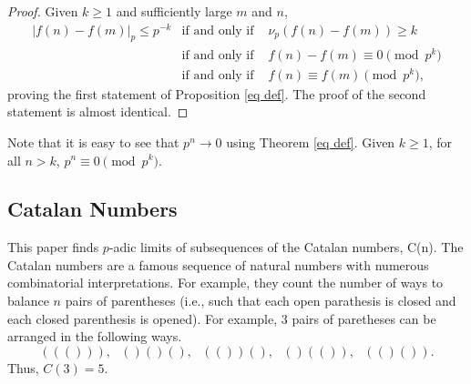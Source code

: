 \documentclass[12pt, letter]{article}    %
\theoremstyle{plain}
\newtheorem{theorem}{Theorem}[section]
\theoremstyle{definition}
\numberwithin{equation}{section}
\newcommand{\Lim}[1]{\raisebox{0.5ex}{\scalebox{0.8}{$\displaystyle \lim_{#1}\;$}}}
\newcommand{\thref}[1]{Theorem \ref{#1}}
\newcommand{\propref}[1]{Proposition \ref{#1}}
\newcommand{\fcite}[1]{[#1]}
\newcommand{\thlabel}[1]{\label{#1}}
\begin{document}
\begin{proof}
Given $k\geq1$ and sufficiently large $m$ and $n$,
\begin{eqnarray*}
\left|f(n)-f(m)\right|_p\leq p^{-k}
&\text{if and only if }& \nu_p(f(n)-f(m))\geq k\\
&\text{if and only if }& f(n)-f(m)\equiv 0\pmod{p^k}\\
&\text{if and only if }& f(n)\equiv f(m)\pmod{p^k},
\end{eqnarray*}
proving the first statement of \propref{eq def}. The proof of the second statement is almost identical.\end{proof}

Note that it is easy to see that $p^n\rightarrow 0$ using \thref{eq def}. Given $k\geq1$, for all $n>k$, $p^n\equiv0\pmod{p^k}$.







\subsection{Catalan Numbers}

This paper finds $p$-adic limits of subsequences of the Catalan numbers, C(n). The Catalan numbers are a famous sequence of natural numbers with numerous combinatorial interpretations. For example, they count the number of ways to balance $n$ pairs of parentheses (i.e., such that each open parathesis is closed and each closed parenthesis is opened). For example, $3$ pairs of paretheses can be arranged in the following ways.
$$((())), \text{ } ()()(), \text{ }  (())(), \text{ }  ()(()),\text{ }   (()()).$$
Thus, $C(3)=5$.
\end{document}
